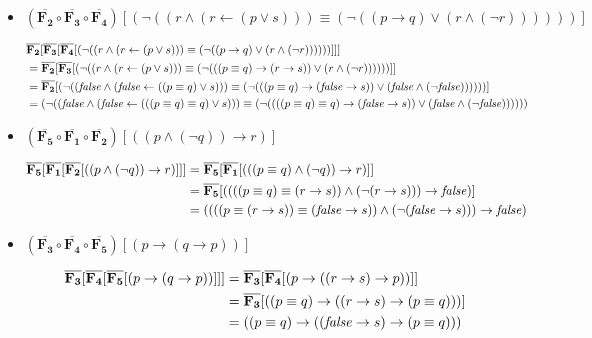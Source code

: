 \documentclass{article}
\newcommand{\val}[2]{\mathbf{#1}[#2]}
\newlength{\logicv}
\newenvironment{logicenv}[2][0]{
  \begin{tcolorbox}[demo, title = #2]
  \vspace*{#1\logicv}
}{
  \end{tcolorbox}
}
\begin{document}
\begin{itemize}
    \item $\val{(\overline{F_2} \circ \overline{F_3} \circ \overline{F_4})}{(\neg ((r \land (r \gets (p \lor s))) \equiv (\neg ((p \to q) \lor (r \land (\neg r))))))}$
    \begin{logicenv}{punto 3}
        \begin{alignat*}{2}
            &\val{\overline{F_2}}{\val{\overline{F_3}}{\val{\overline{F_4}}{(\neg ((r \land (r \gets (p \lor s))) \equiv (\neg ((p \to q) \lor (r \land (\neg r))))))}}}\\
            &= \val{\overline{F_2}}{\val{\overline{F_3}}{(\neg ((r \land (r \gets (p \lor s))) \equiv (\neg (((p \equiv q) \to (r \to s)) \lor (r \land (\neg r))))))}}\\
            &= \val{\overline{F_2}}{(\neg ((\textrm{\textit{false}} \land (\textrm{\textit{false}} \gets ((p \equiv q) \lor s))) \equiv (\neg (((p \equiv q) \to (\textrm{\textit{false}} \to s)) \lor (\textrm{\textit{false}} \land (\neg \textrm{\textit{false}}))))))}\\
            &= (\neg ((\textrm{\textit{false}} \land (\textrm{\textit{false}} \gets (((p \equiv q) \equiv q) \lor s))) \equiv (\neg ((((p \equiv q) \equiv q) \to (\textrm{\textit{false}} \to s)) \lor (\textrm{\textit{false}} \land (\neg \textrm{\textit{false}}))))))
        \end{alignat*}
    \end{logicenv}

    \item $\val{(\overline{F_5} \circ \overline{F_1} \circ \overline{F_2})}{((p \land (\neg q)) \to r)}$
    \begin{logicenv}{punto 3}
        \begin{alignat*}{2}
            \val{\overline{F_5}}{\val{\overline{F_1}}{\val{\overline{F_2}}{((p \land (\neg q)) \to r)}}} &= \val{\overline{F_5}}{\val{\overline{F_1}}{(((p \equiv q) \land (\neg q)) \to r)}}\\
            &= \val{\overline{F_5}}{((((p \equiv q) \equiv (r \to s)) \land (\neg (r \to s))) \to \textrm{\textit{false}})}\\
            &= ((((p \equiv (r \to s)) \equiv (\textrm{\textit{false}} \to s)) \land (\neg (\textrm{\textit{false}} \to s))) \to \textrm{\textit{false}})
        \end{alignat*}
    \end{logicenv}

    \item $\val{(\overline{F_3} \circ \overline{F_4} \circ \overline{F_5})}{(p \to (q \to p))}$
    \begin{logicenv}{punto 3}
        \begin{alignat*}{2}
            \val{\overline{F_3}}{\val{\overline{F_4}}{\val{\overline{F_5}}{(p \to (q \to p))}}} &= \val{\overline{F_3}}{\val{\overline{F_4}}{(p \to ((r \to s) \to p))}}\\
            &= \val{\overline{F_3}}{((p \equiv q) \to ((r \to s) \to (p \equiv q)))}\\
            &= ((p \equiv q) \to ((\textrm{\textit{false}} \to s) \to (p \equiv q)))
        \end{alignat*}
    \end{logicenv}


\end{itemize}
\end{document}
